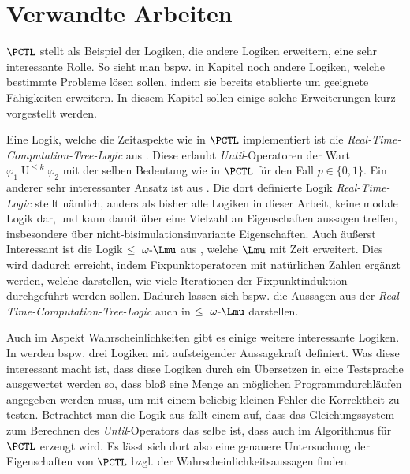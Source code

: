\section{Verwandte Arbeiten}

$\PCTL$ stellt als Beispiel der Logiken, die andere Logiken erweitern, eine sehr interessante Rolle.
So sieht man bspw. in Kapitel noch andere Logiken, welche bestimmte Probleme lösen sollen, indem sie bereits etablierte um geeignete Fähigkeiten erweitern.
In diesem Kapitel sollen einige solche Erweiterungen kurz vorgestellt werden.

Eine Logik, welche die Zeitaspekte wie in $\PCTL$ implementiert ist die \textit{Real-Time-Computation-Tree-Logic} aus \cite{emerson1991quantitative}. 
Diese erlaubt \textit{Until}-Operatoren der Wart $\varphi_1 \operatorname{U}^{\leq k} \varphi_2$ mit der selben Bedeutung wie in $\PCTL$ für den Fall $p\in \{0,1\}$.
Ein anderer sehr interessanter Ansatz ist aus \cite{jahanian1986safety}.
Die dort definierte Logik \textit{Real-Time-Logic} stellt nämlich, anders als bisher alle Logiken in dieser Arbeit, keine modale Logik dar, und kann damit über eine Vielzahl an Eigenschaften aussagen treffen, insbesondere über nicht-bisimulationsinvariante Eigenschaften.
Auch äußerst Interessant ist die Logik $\leq\text{ }\omega\text{-}\Lmu$ aus \cite{emerson1991real}, welche $\Lmu$ mit Zeit erweitert.
Dies wird dadurch erreicht, indem Fixpunktoperatoren mit natürlichen Zahlen ergänzt werden, welche darstellen, wie viele Iterationen der Fixpunktinduktion durchgeführt werden sollen.
Dadurch lassen sich bspw. die Aussagen aus der \textit{Real-Time-Computation-Tree-Logic} auch in $\leq\text{ }\omega\text{-}\Lmu$ darstellen.

Auch im Aspekt Wahrscheinlichkeiten gibt es einige weitere interessante Logiken. 
In \cite{larsen1989bisimulation} werden bspw. drei Logiken mit aufsteigender Aussagekraft definiert.
Was diese interessant macht ist, dass diese Logiken durch ein Übersetzen in eine \glqq Testsprache\grqq{} ausgewertet werden so, dass bloß eine Menge an möglichen Programmdurchläufen angegeben werden muss, um mit einem beliebig kleinen Fehler die Korrektheit zu testen.
Betrachtet man die Logik aus \cite{courcoubetis1995complexity} fällt einem auf, dass das Gleichungssystem zum Berechnen des \textit{Until}-Operators das selbe ist, dass auch im Algorithmus für $\PCTL$ erzeugt wird.
Es lässt sich dort also eine genauere Untersuchung der Eigenschaften von $\PCTL$ bzgl. der Wahrscheinlichkeitsaussagen finden.


